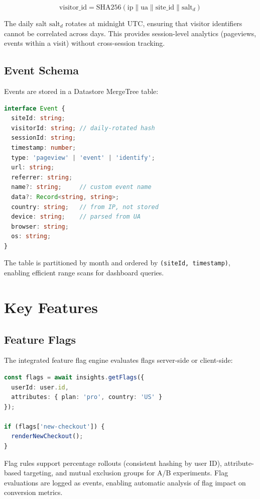 \documentclass[11pt,twocolumn]{article}
\begin{document}
\begin{equation}
    \text{visitor\_id} = \text{SHA256}(\text{ip} \| \text{ua} \| \text{site\_id} \| \text{salt}_d)
\end{equation}

The daily salt $\text{salt}_d$ rotates at midnight UTC, ensuring that visitor identifiers cannot be correlated across days. This provides session-level analytics (pageviews, events within a visit) without cross-session tracking.

\subsection{Event Schema}

Events are stored in a Datastore MergeTree table:

\begin{lstlisting}[language=TypeScript]
interface Event {
  siteId: string;
  visitorId: string; // daily-rotated hash
  sessionId: string;
  timestamp: number;
  type: 'pageview' | 'event' | 'identify';
  url: string;
  referrer: string;
  name?: string;     // custom event name
  data?: Record<string, string>;
  country: string;   // from IP, not stored
  device: string;    // parsed from UA
  browser: string;
  os: string;
}
\end{lstlisting}

The table is partitioned by month and ordered by \texttt{(siteId, timestamp)}, enabling efficient range scans for dashboard queries.

\section{Key Features}

\subsection{Feature Flags}

The integrated feature flag engine evaluates flags server-side or client-side:

\begin{lstlisting}[language=TypeScript]
const flags = await insights.getFlags({
  userId: user.id,
  attributes: { plan: 'pro', country: 'US' }
});

if (flags['new-checkout']) {
  renderNewCheckout();
}
\end{lstlisting}

Flag rules support percentage rollouts (consistent hashing by user ID), attribute-based targeting, and mutual exclusion groups for A/B experiments. Flag evaluations are logged as events, enabling automatic analysis of flag impact on conversion metrics.
\end{document}
